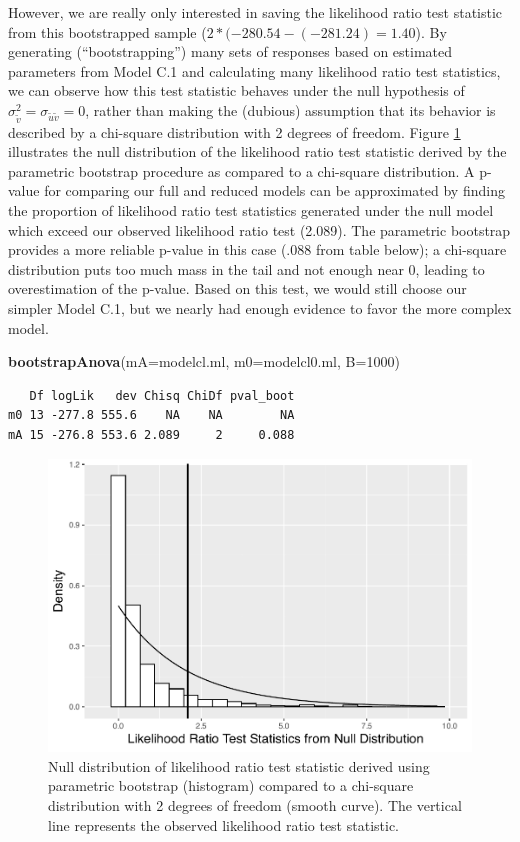 \documentclass[
]{krantz}
\newenvironment{Shaded}{\begin{snugshade}}{\end{snugshade}}
\newcommand{\DataTypeTok}[1]{\textcolor[rgb]{0.27,0.27,0.27}{#1}}
\newcommand{\DecValTok}[1]{\textcolor[rgb]{0.06,0.06,0.06}{#1}}
\newcommand{\KeywordTok}[1]{\textcolor[rgb]{0.27,0.27,0.27}{\textbf{#1}}}
\newcommand{\NormalTok}[1]{#1}
\begin{document}
However, we are really only interested in saving the likelihood ratio test statistic from this bootstrapped sample (\(2*(-280.54 - (-281.24) = 1.40\)). By generating (``bootstrapping'') many sets of responses based on estimated parameters from Model C.1 and calculating many likelihood ratio test statistics, we can observe how this test statistic behaves under the null hypothesis of \(\sigma_{\tilde{v}}^{2} = \sigma_{\tilde{u}\tilde{v}} = 0\), rather than making the (dubious) assumption that its behavior is described by a chi-square distribution with 2 degrees of freedom. Figure \ref{fig:paraboot10} illustrates the null distribution of the likelihood ratio test statistic derived by the parametric bootstrap procedure as compared to a chi-square distribution. A p-value for comparing our full and reduced models can be approximated by finding the proportion of likelihood ratio test statistics generated under the null model which exceed our observed likelihood ratio test (2.089). The parametric bootstrap provides a more reliable p-value in this case (.088 from table below); a chi-square distribution puts too much mass in the tail and not enough near 0, leading to overestimation of the p-value. Based on this test, we would still choose our simpler Model C.1, but we nearly had enough evidence to favor the more complex model.

\begin{Shaded}
\begin{Highlighting}[]
\KeywordTok{bootstrapAnova}\NormalTok{(}\DataTypeTok{mA=}\NormalTok{modelcl.ml, }\DataTypeTok{m0=}\NormalTok{modelcl0.ml, }\DataTypeTok{B=}\DecValTok{1000}\NormalTok{)}
\end{Highlighting}
\end{Shaded}

\begin{verbatim}
   Df logLik   dev Chisq ChiDf pval_boot
m0 13 -277.8 555.6    NA    NA        NA
mA 15 -276.8 553.6 2.089     2     0.088
\end{verbatim}

\begin{figure}

{\centering \includegraphics[width=0.6\linewidth]{bookdown-BeyondMLR_files/figure-latex/paraboot10-1} 

}

\caption{Null distribution of likelihood ratio test statistic derived using parametric bootstrap (histogram) compared to a chi-square distribution with 2 degrees of freedom (smooth curve).  The vertical line represents the observed likelihood ratio test statistic.}\label{fig:paraboot10}
\end{figure}
\end{document}
